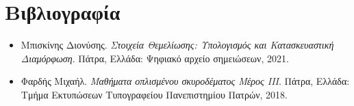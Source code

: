 \chapter*{Βιβλιογραφία}
\renewcommand{\labelitemi}{$\blacksquare$}
\begin{itemize}
  \item Μπισκίνης Διονύσης. \emph{Στοιχεία Θεμελίωσης: Υπολογισμός και Κατασκευαστική Διαμόρφωση}. Πάτρα, Ελλάδα: Ψηφιακό αρχείο σημειώσεων, 2021.
  \item Φαρδής Μιχαήλ. \emph{Μαθήματα οπλισμένου σκυροδέματος Μέρος ΙΙΙ}. Πάτρα, Ελλάδα: Τμήμα Εκτυπώσεων Τυπογραφείου Πανεπιστημίου Πατρών, 2018.
\end{itemize}
